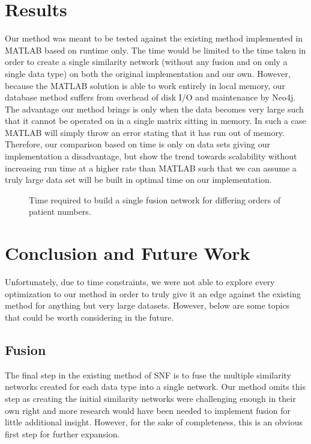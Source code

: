 \documentclass[12pt]{article}
\begin{document}
\section*{Results}
\quad Our method was meant to be tested against the existing method implemented in MATLAB based on runtime only. The time would be limited to the time taken in order to create a single similarity network (without any fusion and on only a single data type) on both the original implementation and our own. However, because the MATLAB solution is able to work entirely in local memory, our database method suffers from overhead of disk I/O and maintenance by Neo4j. The advantage our method brings is only when the data becomes very large such that it cannot be operated on in a single matrix sitting in memory. In such a case MATLAB will simply throw an error stating that it has run out of memory. Therefore, our comparison based on time is only on data sets giving our implementation a disadvantage, but show the trend towards scalability without increasing run time at a higher rate than MATLAB such that we can assume a truly large data set will be built in optimal time on our implementation.
\begin{figure}
	\caption{Time required to build a single fusion network for differing orders of patient numbers.}
\end{figure}

\section*{Conclusion and Future Work}
\quad Unfortunately, due to time constraints, we were not able to explore every optimization to our method in order to truly give it an edge against the existing method for anything but very large datasets. However, below are some topics that could be worth considering in the future.
\subsection*{Fusion}
The final step in the existing method of SNF is to fuse the multiple similarity networks created for each data type into a single network. Our method omits this step as creating the initial similarity networks were challenging enough in their own right and more research would have been needed to implement fusion for little additional insight. However, for the sake of completeness, this is an obvious first step for further expansion.
\end{document}
